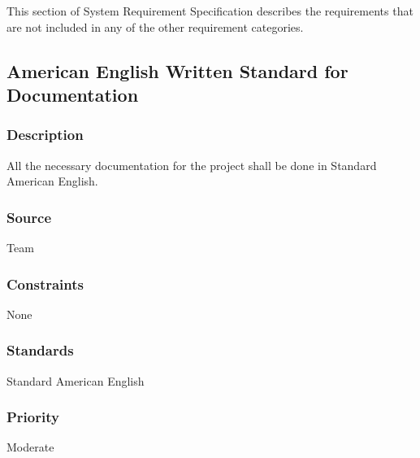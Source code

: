 This section of System Requirement Specification describes the requirements that are not included in any of the other requirement categories. 

\subsection{American English Written Standard for Documentation}
\subsubsection{Description}
All the necessary documentation for the project shall be done in Standard American English. 
\subsubsection{Source}
Team
\subsubsection{Constraints}
None
\subsubsection{Standards}
Standard American English
\subsubsection{Priority}
Moderate
